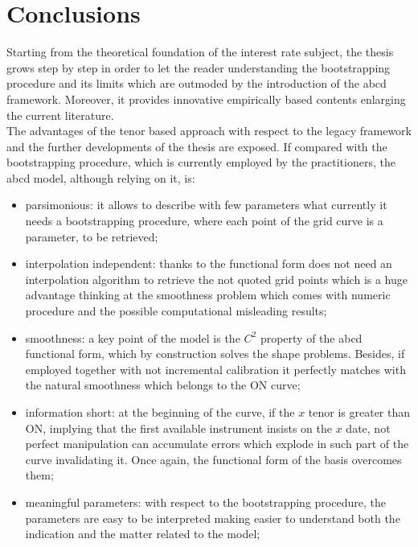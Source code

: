 \chapter{Conclusions}


Starting from the theoretical foundation of the interest rate subject, the thesis grows step by step in order to let the reader understanding the bootstrapping procedure and its limits which are outmoded by the introduction of the abcd framework. Moreover, it provides innovative empirically based contents enlarging the current literature.\\
The advantages of the tenor based approach with respect to the legacy framework and the further developments of the thesis are exposed.
If compared with the bootstrapping procedure, which is currently employed by the practitioners, the abcd model, although relying on it, is:

\begin{itemize}
    \item parsimonious: it allows to  describe with few parameters what currently it needs a bootstrapping procedure, where each point of the grid curve is a parameter, to be retrieved;
    \item interpolation independent: thanks to the functional form does not need an interpolation algorithm to retrieve the not quoted grid points which is a huge advantage thinking at the smoothness problem which comes with numeric procedure and the possible computational misleading results;
    \item smoothness: a key point of the model is the $C^{2}$ property of the abcd functional form, which by construction solves the shape problems. Besides, if employed together with not incremental calibration it perfectly matches with the natural smoothness which belongs to the ON curve;
    \item information short: at the beginning of the curve, if the $x$ tenor is greater than ON, implying that the first available instrument insists on the $x$ date, not perfect manipulation can accumulate errors which explode in such part of the curve invalidating it. Once again, the functional form of the basis overcomes them;
    \item meaningful parameters: with respect to the bootstrapping procedure, the parameters are easy to be interpreted making easier to understand both the indication and the matter related to the model;
\end{itemize} 

